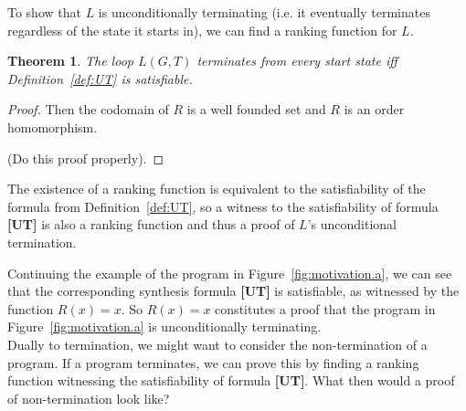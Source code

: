 \documentclass[preprint]{sigplanconf}
\newtheorem{theorem}{Theorem}
\theoremstyle{definition}
\begin{document}
\iffalse
Many loops do not terminate for all starting states, but are contained in programs that guarantee the loop will
terminate.  Traditional termination provers have difficulty reasoning about such conditionally-terminating loops.
We are able to handle such loops by computing \emph{termination invariants}.  This mechanism also allows us to
prove that programs with multiple loops terminate, even if the termination of some loop depends on the states
reachable after leaving a previous loop.

Our method for ranking function synthesis can be stated as follows:
discuss what spec is used (non-lexicographic vs lexicographic) + the completeness claims.
Any termination guarantees?  
\fi


To show that $L$ is unconditionally terminating (i.e. it eventually terminates regardless of the
state it starts in), we can find a ranking function for $L$.

\begin{theorem}
\label{thm:ut}
 The loop $L(G, T)$ terminates from every start state iff Definition~\ref{def:UT} is
 satisfiable.
\end{theorem}

\begin{proof}
 Then the codomain of $R$ is a well founded set and $R$ is an order homomorphism.

 (Do this proof properly).
\end{proof}

The existence of a ranking function is equivalent to the satisfiability
of the formula from Definition~\ref{def:UT}, so a witness to the satisfiability
of formula {\bf [UT]} is also a ranking function and thus a proof of $L$'s unconditional termination.

Continuing the example of the program in Figure~\ref{fig:motivation.a}, we can see that
the corresponding synthesis formula {\bf [UT]} is satisfiable, as witnessed by the function $R(x) = x$.
So $R(x) = x$ constitutes a proof that the program in Figure~\ref{fig:motivation.a} is unconditionally
terminating.\\

Dually to termination, we might want to consider the non-termination of a program.  If a program terminates,
we can prove this by finding a ranking function %
witnessing the satisfiability of formula {\bf[UT]}.  What then would a proof of non-termination look like?
\end{document}
